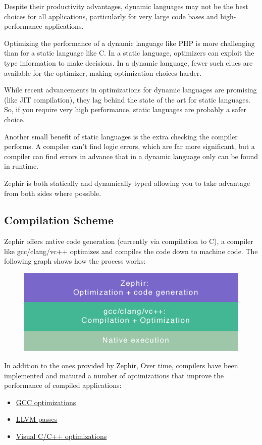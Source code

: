 \documentclass[letterpaper,10pt,english]{sphinxmanual}
\begin{document}
Despite their productivity advantages, dynamic languages may not be the best choices for all applications,
particularly for very large code bases and high-performance applications.

Optimizing the performance of a dynamic language like PHP is more challenging than for a static language like C.
In a static language, optimizers can exploit the type information to make decisions. In a dynamic language,
fewer such clues are available for the optimizer, making optimization choices harder.

While recent advancements in optimizations for dynamic languages are promising (like JIT compilation),
they lag behind the state of the art for static languages. So, if you require very high performance,
static languages are probably a safer choice.

Another small benefit of static languages is the extra checking the compiler performs.
A compiler can’t find logic errors, which are far more significant,
but a compiler can find errors in advance that in a dynamic language only can be
found in runtime.

Zephir is both statically and dynamically typed allowing you to take advantage from both sides where
possible.


\subsection{Compilation Scheme}
\label{motivation:compilation-scheme}
Zephir offers native code generation (currently via compilation to C), a compiler like gcc/clang/vc++
optimizes and compiles the code down to machine code. The following graph shows how the process works:
\begin{figure}[htbp]
\centering

\includegraphics{scheme.png}
\end{figure}

In addition to the ones provided by Zephir, Over time, compilers have been implemented
and matured a number of optimizations that improve the performance of compiled applications:
\begin{itemize}
\item {} 
\href{http://gcc.gnu.org/onlinedocs/gcc-4.1.0/gcc/Optimize-Options.html}{GCC optimizations}

\item {} 
\href{http://llvm.org/docs/Passes.html}{LLVM passes}

\item {} 
\href{http://msdn.microsoft.com/en-us/library/k1ack8f1.aspx}{Visual C/C++ optimizations}

\end{itemize}
\end{document}

